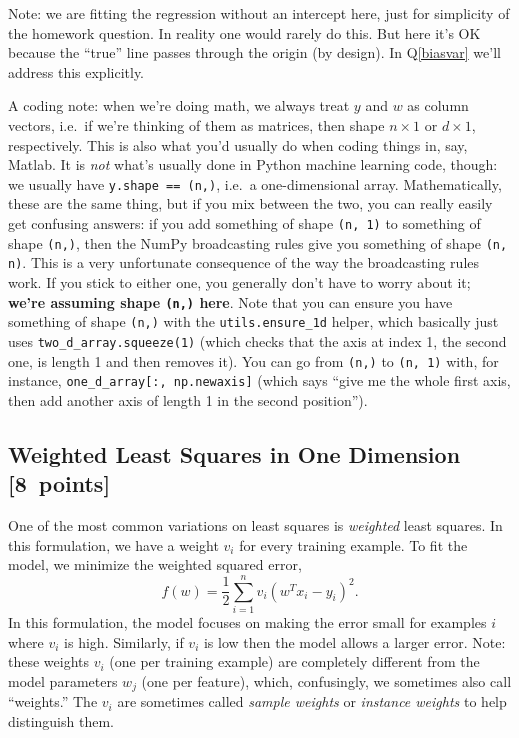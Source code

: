 \documentclass{article}
\newcommand\pts[1]{\textcolor{pointscolour}{[#1~points]}}
\begin{document}
Note: we are fitting the regression without an intercept here, just for simplicity of the homework question.
In reality one would rarely do this. But here it's OK because the ``true'' line
passes through the origin (by design). In Q\ref{biasvar} we'll address this explicitly.

A coding note:
when we're doing math, we always treat $y$ and $w$ as column vectors,
i.e.\ if we're thinking of them as matrices, then shape $n \times 1$ or $d \times 1$, respectively.
This is also what you'd usually do when coding things in, say, Matlab.
It is \emph{not} what's usually done in Python machine learning code, though:
we usually have \verb|y.shape == (n,)|, i.e.\ a one-dimensional array.
Mathematically, these are the same thing, but if you mix between the two,
you can really easily get confusing answers:
if you add something of shape \texttt{(n, 1)} to something of shape \texttt{(n,)},
then the NumPy broadcasting rules give you something of shape \texttt{(n, n)}.
This is a very unfortunate consequence of the way the broadcasting rules work.
If you stick to either one, you generally don't have to worry about it;
\textbf{we're assuming shape \texttt{(n,)} here}.
Note that you can
ensure you have something of shape \texttt{(n,)} with the \texttt{utils.ensure\_1d} helper, which basically just uses
\texttt{two\_d\_array.squeeze(1)}
(which checks that the axis at index 1, the second one, is length 1 and then removes it).
You can go from \texttt{(n,)} to \texttt{(n, 1)} with, for instance, \texttt{one\_d\_array[:, np.newaxis]}
(which says ``give me the whole first axis, then add another axis of length 1 in the second position'').

\subsection{Weighted Least Squares in One Dimension \pts{8}}

One of the most common variations on least squares is \emph{weighted} least squares. In this formulation, we have a weight $v_i$ for every training example. To fit the model, we minimize the weighted squared error,
\[
f(w) =  \frac{1}{2}\sum_{i=1}^n v_i(w^Tx_i - y_i)^2.
\]
In this formulation, the model focuses on making the error small for examples $i$ where $v_i$ is high. Similarly, if $v_i$ is low then the model allows a larger error. Note: these weights $v_i$ (one per training example) are completely different from the model parameters $w_j$ (one per feature), which, confusingly, we sometimes also call ``weights.'' The $v_i$ are sometimes called \emph{sample weights} or \emph{instance weights} to help distinguish them.
\end{document}
